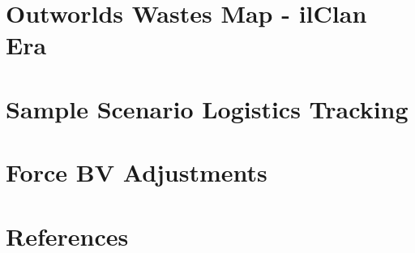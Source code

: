 \documentclass{article}
\begin{document}


\newpage

\section{Outworlds Wastes Map - ilClan Era}



\newpage

\section{Sample Scenario Logistics Tracking}



\newpage

\section{Force BV Adjustments}
\label{sec:force_bv_adjustments}



\newpage

\section{References}
\label{sec:references}



\newpage


\clearpage

\setlength{\headsep}{25pt}
\end{document}
